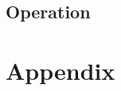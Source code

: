 \documentclass{article}
\begin{document}


\subsection{Operation}

\newpage
\printbibliography[
heading=bibintoc
]

\newpage
\section{Appendix}
\end{document}
